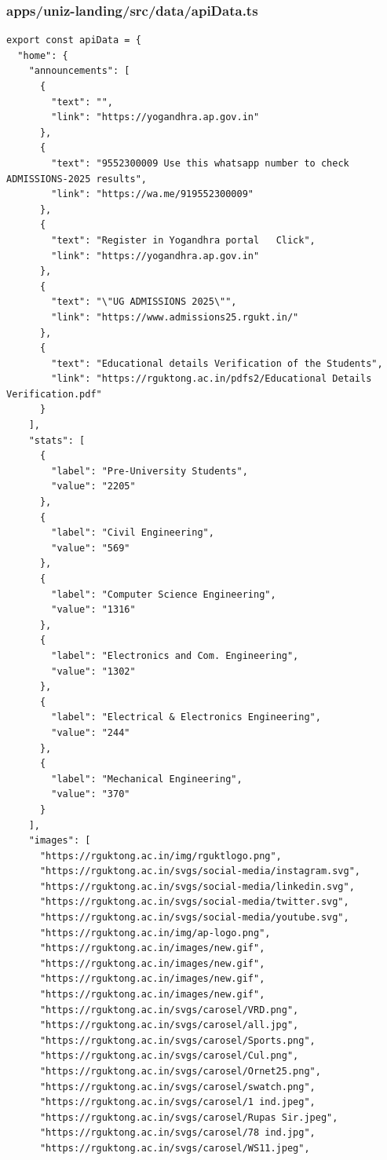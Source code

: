 \documentclass[11pt,a4paper,oneside]{article}
\begin{document}
\subsubsection*{apps/uniz-landing/src/data/apiData.ts}
\begin{lstlisting}
export const apiData = {
  "home": {
    "announcements": [
      {
        "text": "",
        "link": "https://yogandhra.ap.gov.in"
      },
      {
        "text": "9552300009 Use this whatsapp number to check ADMISSIONS-2025 results",
        "link": "https://wa.me/919552300009"
      },
      {
        "text": "Register in Yogandhra portal   Click",
        "link": "https://yogandhra.ap.gov.in"
      },
      {
        "text": "\"UG ADMISSIONS 2025\"",
        "link": "https://www.admissions25.rgukt.in/"
      },
      {
        "text": "Educational details Verification of the Students",
        "link": "https://rguktong.ac.in/pdfs2/Educational Details Verification.pdf"
      }
    ],
    "stats": [
      {
        "label": "Pre-University Students",
        "value": "2205"
      },
      {
        "label": "Civil Engineering",
        "value": "569"
      },
      {
        "label": "Computer Science Engineering",
        "value": "1316"
      },
      {
        "label": "Electronics and Com. Engineering",
        "value": "1302"
      },
      {
        "label": "Electrical & Electronics Engineering",
        "value": "244"
      },
      {
        "label": "Mechanical Engineering",
        "value": "370"
      }
    ],
    "images": [
      "https://rguktong.ac.in/img/rguktlogo.png",
      "https://rguktong.ac.in/svgs/social-media/instagram.svg",
      "https://rguktong.ac.in/svgs/social-media/linkedin.svg",
      "https://rguktong.ac.in/svgs/social-media/twitter.svg",
      "https://rguktong.ac.in/svgs/social-media/youtube.svg",
      "https://rguktong.ac.in/img/ap-logo.png",
      "https://rguktong.ac.in/images/new.gif",
      "https://rguktong.ac.in/images/new.gif",
      "https://rguktong.ac.in/images/new.gif",
      "https://rguktong.ac.in/images/new.gif",
      "https://rguktong.ac.in/svgs/carosel/VRD.png",
      "https://rguktong.ac.in/svgs/carosel/all.jpg",
      "https://rguktong.ac.in/svgs/carosel/Sports.png",
      "https://rguktong.ac.in/svgs/carosel/Cul.png",
      "https://rguktong.ac.in/svgs/carosel/Ornet25.png",
      "https://rguktong.ac.in/svgs/carosel/swatch.png",
      "https://rguktong.ac.in/svgs/carosel/1 ind.jpeg",
      "https://rguktong.ac.in/svgs/carosel/Rupas Sir.jpeg",
      "https://rguktong.ac.in/svgs/carosel/78 ind.jpg",
      "https://rguktong.ac.in/svgs/carosel/WS11.jpeg",

\end{lstlisting}
\end{document}
